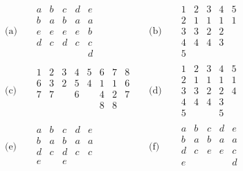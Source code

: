 \documentclass[a4paper,12pt,twoside,spanish,reqno]{amsbook}
\numberwithin{equation}{section}
\begin{document}
\begin{enumerate}
\begin{align*}
    &\text{(a)}&&\begin{matrix}
        a&b&c&d&e \\\hline
        b&a&b&a&a \\
        e&e&e&e&b \\
        d&c&d&c&c \\
        &&&&d
        \end{matrix}&
    &\text{(b)}&& \begin{matrix}
         1& 2& 3& 4& 5\\ \hline
         2& 1& 1& 1& 1\\
         3& 3& 2& 2& \\
         4& 4& 4& 3&\\
         5& & & & 
        \end{matrix}
\\[0.3cm]
    &\text{(c)}&&\begin{matrix}
        1& 2& 3& 4& 5& 6& 7& 8\\ \hline
        6& 3& 2& 5& 4& 1& 1& 6\\
        7& 7& & 6& & 4& 2& 7\\
        & & & & & 8& 8& \\
        & & & & & & & 
    \end{matrix}&
    &\text{(d)}&&\begin{matrix}
        1& 2& 3& 4& 5\\ \hline
        2& 1& 1& 1& 1\\
        3& 3& 2& 2& 4\\
        4& 4& 4& 3& \\
        5& & & 5& 
       \end{matrix}       
\\[0.3cm]
    &\text{(e)}&&\begin{matrix}
        a& b& c& d& e\\ \hline
        b& a& b& a& a\\
        d& c& d& c& c\\
        e& & e& & \\
       \end{matrix}&
    &\text{(f)}&&\begin{matrix}
        a& b& c& d& e\\ \hline
        b& a& b& a& a\\
        d& c& e& e& c\\
        e& & & & d\\
       \end{matrix}
\end{align*}


\end{enumerate}
\end{document}
